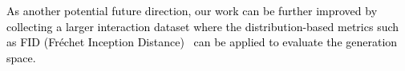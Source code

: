 \documentclass[times,twocolumn,final]{elsarticle}
\begin{document}
\textcolor{black}{As another potential future direction, our work can be further improved by collecting a larger interaction dataset where the distribution-based metrics such as FID (Fréchet Inception Distance)~\cite{heusel2017gans} can be applied to evaluate the generation space.}




\end{document}
